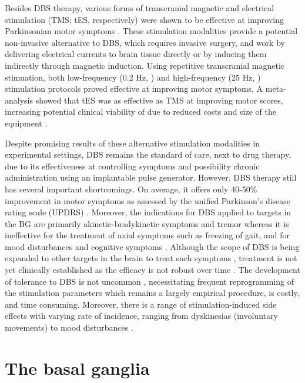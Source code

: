 Besides DBS therapy, various forms of transcranial magnetic and
electrical stimulation (TMS; tES, respectively) were shown to be effective at improving Parkinsonian motor symptoms \cite{goodwill_using_2017}. These stimulation modalities provide a potential non-invasive
alternative to DBS, which requires invasive surgery, and work by delivering electrical
currents to brain tissue directly or by inducing them indirectly through magnetic induction.
Using repetitive transcranial magnetic stimuation, both low-frequency (0.2 Hz, \cite{shimamoto_therapeutic_2001}) and high-frequency (25 Hz, \cite{khedr_effect_2006})
stimulation protocols proved effective at improving motor symptoms. A meta-analysis
showed that tES was as effective as TMS at improving motor scores, increasing potential
clinical viability of due to reduced costs and size of the equipment \cite{goodwill_using_2017}.

%
%
%
Despite promising results of these alternative stimulation modalities in experimental
settings, DBS remains the standard of care, next to drug therapy, due to its effectiveness
at controlling symptoms and possibility chronic administration using an implantable pulse generator.
However, DBS therapy still has several important shortcomings. On average, it offers only
40-50\% improvement in motor symptoms as assessed by the unified Parkinson's
disease rating scale (UPDRS) \cite{chen2006deep,schuepbach_neurostimulation_2013}.
Moreover, the indications for DBS applied to targets in the BG are primarily
akinetic-bradykinetic symptoms and tremor whereas it is ineffective for the treatment of
axial symptoms such as freezing of gait, and for mood disturbances and cognitive symptoms
\cite{eisenstein_acute_2014,merola_impulse_2017}. Although the scope of DBS
is being expanded to other targets in the brain to treat such symptoms \cite{thevathasan_pedunculopontine_2011}, treatment is not yet clinically established
as the efficacy is not robust over time \cite{huang_deep_2018}.
The development of tolerance to DBS is not uncommon \cite{kumar_long-term_2003,houeto_failure_2000},
necessitating frequent reprogramming of the stimulation parameters
which remains a largely empirical procedure, is costly, and time consuming.
Moreover, there is a range of stimulation-induced side effects with varying
rate of incidence, ranging from dyskinesias (involuntary movements) to
mood disturbances \cite{guehl_statistical_2007,benabid_deep_2009}.
%
%


\section{The basal ganglia}
%
%
%
%
%
%
%
%
%
%
%

